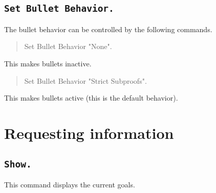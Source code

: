 \subsection[\tt Set Bullet Behavior.]{\tt Set Bullet Behavior.}

The bullet behavior can be controlled by the following commands.

\begin{quote}
Set Bullet Behavior "None".
\end{quote}

This makes bullets inactive.

\begin{quote}
Set Bullet Behavior "Strict Subproofs".
\end{quote}

This makes bullets active (this is the default behavior).

\section{Requesting information}

\subsection[\tt Show.]{\tt Show.\label{Show}}
This command displays the current goals.

